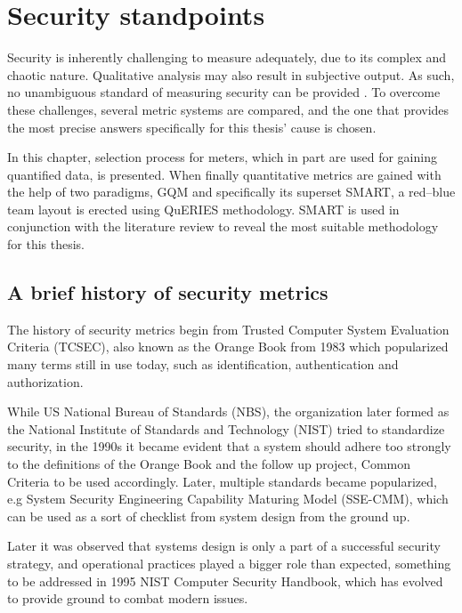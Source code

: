 \chapter{Security standpoints} \label{securitystandpoints}

Security is inherently challenging to measure adequately, due to its
complex and chaotic nature. Qualitative analysis may also result in
subjective output. As such, no unambiguous standard of measuring
security can be provided \cite{wang2005information}. To overcome these
challenges, several metric systems are compared, and the one that
provides the most precise answers specifically for this thesis' cause
is chosen.

In this chapter, selection process for meters, which in part are used
for gaining quantified data, is presented.  When finally quantitative
metrics are gained with the help of two paradigms, GQM and
specifically its superset SMART, a red–blue team layout is erected
using QuERIES methodology. SMART is used in conjunction with the
literature review to reveal the most suitable methodology for this
thesis.

\section{A brief history of security metrics}

The history of security metrics begin from Trusted Computer System
Evaluation Criteria (TCSEC), also known as the Orange Book from 1983
which popularized many terms still in use today, such as
identification, authentication and
authorization. \cite{bayuk2013measuring}

While US National Bureau of Standards (NBS), the organization later
formed as the National Institute of Standards and Technology (NIST)
tried to standardize security, in the 1990s it became evident that a
system should adhere too strongly to the definitions of the Orange
Book and the follow up project, Common Criteria to be used
accordingly. Later, multiple standards became popularized, e.g System
Security Engineering Capability Maturing Model (SSE-CMM), which can be
used as a sort of checklist from system design from the ground
up. \cite{bayuk2013measuring}

Later it was observed that systems design is only a part of a
successful security strategy, and operational practices played a
bigger role than expected, something to be addressed in 1995 NIST
Computer Security Handbook, which has evolved to provide ground to
combat modern issues. \cite{bayuk2013measuring}

